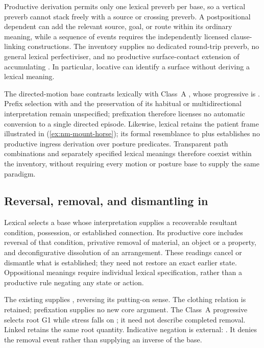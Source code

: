 Productive derivation permits only one lexical preverb per base, so a vertical
preverb cannot stack freely with a source or crossing preverb. A postpositional
dependent can add the relevant source, goal, or route within its ordinary
meaning, while a sequence of events requires the independently licensed
clause-linking constructions. The inventory supplies no dedicated round-trip
preverb, no general lexical perfectiviser, and no productive surface-contact
extension of accumulating . In particular, locative 
can identify a surface without deriving a lexical  meaning.

The directed-motion base  contrasts lexically with Class~A
 , whose progressive
is . Prefix selection with  and the preservation of its habitual or
multidirectional interpretation remain unspecified; prefixation therefore
licenses no automatic conversion to a single directed episode.
Likewise, lexical  
retains the patient frame illustrated in (\ref{ex:nm-mount-horse}); its formal
resemblance to  plus   establishes no
productive ingress derivation over posture predicates. Transparent path
combinations and separately specified lexical meanings therefore coexist
within the inventory, without requiring every motion or posture base to
supply the same paradigm.

\subsection{Reversal, removal, and dismantling in }\label{sec:reversative-po}

Lexical  selects a base whose interpretation supplies a recoverable
resultant condition, possession, or established connection. Its productive
core includes reversal of that condition, privative removal of material,
an object or a property, and deconfigurative dissolution of an arrangement.
These readings cancel or dismantle what is established; they need not restore
an exact earlier state. Oppositional meanings require individual lexical
specification, rather than a productive rule negating any state or action.

The existing   supplies
 , reversing its putting-on sense.
The clothing relation is retained; prefixation supplies no new core argument.
The Class~A progressive
selects root G1 while stress falls on ; it need not describe
completed removal. Linked  retains the same root quantity.
Indicative negation is external:
.
It denies the removal event rather than supplying an inverse of the base.

